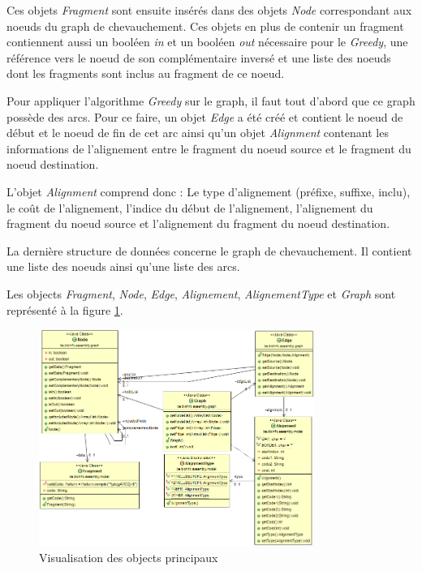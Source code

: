 \documentclass[12pt,a4paper,final]{article}
\begin{document}
Ces objets \textit{Fragment} sont ensuite insérés dans des objets \textit{Node} correspondant aux noeuds du graph de chevauchement.  Ces objets en plus de contenir un fragment contiennent aussi un booléen \textit{in} et un booléen \textit{out} nécessaire pour le \textit{Greedy}, une référence vers le noeud de son complémentaire inversé et une liste des noeuds dont les fragments sont inclus au fragment de ce noeud.\medskip

Pour appliquer l'algorithme \textit{Greedy} sur le graph, il faut tout d'abord que ce graph possède des arcs.  Pour ce faire, un objet \textit{Edge} a été créé et contient le noeud de début et le noeud de fin de cet arc ainsi qu'un objet \textit{Alignment} contenant les informations de l'alignement entre le fragment du noeud source et le fragment du noeud destination.\medskip

L'objet \textit{Alignment} comprend donc : Le type d'alignement (préfixe, suffixe, inclu), le coût de l'alignement, l'indice du début de l'alignement, l'alignement du fragment du noeud source et l'alignement du fragment du noeud destination.\medskip

La dernière structure de données concerne le graph de chevauchement.  Il contient une liste des noeuds ainsi qu'une liste des arcs.

Les objects \textit{Fragment}, \textit{Node}, \textit{Edge}, \textit{Alignement}, \textit{AlignementType} et \textit{Graph} sont représenté à la figure \ref{UMLobj}.

\begin{figure}[!ht]
\centering
	\includegraphics[width=0.8\textwidth]{images/classDiagram_Objects.png}
	\caption{\label{UMLobj}Visualisation des objects principaux}
\end{figure}
\end{document}
